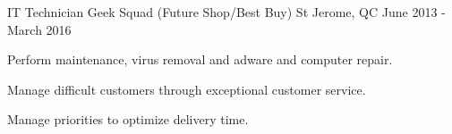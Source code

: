 \begin{cventries}
  \cventry
    {IT Technician}
    {Geek Squad (Future Shop/Best Buy)}
    {St Jerome, QC}
    {June 2013 - March 2016}
    {
      \begin{cvitems}
        \item {Perform maintenance, virus removal and adware and computer repair.}
        \item {Manage difficult customers through exceptional customer service.}
        \item {Manage priorities to optimize delivery time.}
      \end{cvitems}
    }

\end{cventries}